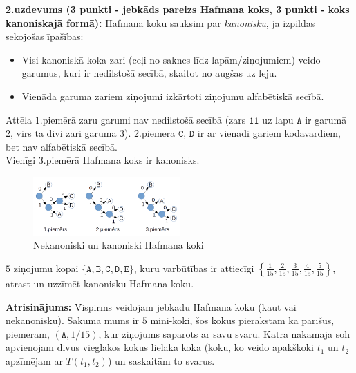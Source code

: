 \documentclass[11pt]{article}
\begin{document}
{\footnotesize
\vspace{6pt}
{\bf 2.uzdevums (3 punkti - jebkāds pareizs Hafmana koks, 3 punkti - koks kanoniskajā formā):}
Hafmana koku sauksim par {\em kanonisku}, ja izpildās sekojošas īpašības:
\begin{itemize}
\item Visi kanoniskā koka zari (ceļi no saknes līdz lapām/ziņojumiem) veido garumus, kuri ir nedilstošā secībā, skaitot no augšas uz leju.
\item Vienāda garuma zariem ziņojumi izkārtoti ziņojumu alfabētiskā secībā.
\end{itemize}
Attēla 1.piemērā zaru garumi nav nedilstošā secībā
(zars $\mathtt{11}$ uz lapu $\mathtt{A}$ ir garumā $2$, virs tā divi zari garumā $3$).
2.piemērā $\mathtt{C}$, $\mathtt{D}$ ir ar vienādi gariem kodavārdiem, bet nav alfabētiskā secībā.\\
Vienīgi 3.piemērā Hafmana koks ir kanonisks.


\begin{figure}[h!]
\begin{center}
\includegraphics[width=0.5\textwidth]{fall2019-midterm/huffman-examples.png}
\caption{Nekanoniski un kanoniski Hafmana koki\label{fig:huffman-examples}}
\end{center}
\end{figure}

$5$ ziņojumu kopai $\{ \mathtt{A},\mathtt{B},\mathtt{C},\mathtt{D},\mathtt{E} \}$, kuru varbūtības ir attiecīgi
${\displaystyle \left\{ \frac{1}{15}, \frac{2}{15},\frac{3}{15},\frac{4}{15},\frac{5}{15} \right\}}$,
atrast un uzzīmēt kanonisku Hafmana koku.
}

\vspace{6pt}
{\bf Atrisinājums:} Vispirms veidojam jebkādu Hafmana koku (kaut vai nekanonisku).
Sākumā mums ir $5$ mini-koki, šos kokus pierakstām kā pārīšus, piemēram,
$(\mathtt{A},1/15)$, kur ziņojums sapārots ar savu svaru.
Katrā nākamajā solī apvienojam divus vieglākos kokus lielākā kokā (koku, ko veido
apakškoki $t_1$ un $t_2$ apzīmējam ar $T(t_1,t_2)$) un saskaitām to svarus.
\end{document}
